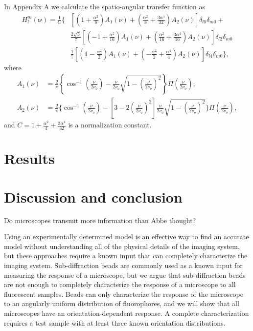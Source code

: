 \documentclass{osa-article}
\providecommand{\bs}[1]{\boldsymbol{#1}}
\begin{document}
In Appendix A we calculate the spatio-angular transfer function as
\begin{align}
  H_l^m(\bs{\nu}) = \frac{1}{C}\Bigg\{&\left[\left(1 + \frac{\alpha^2}{8}\right)A_1(\nu) + \left(\frac{\alpha^2}{8} + \frac{3\alpha^4}{32}\right)A_2(\nu)\right]\delta_{l0}\delta_{m0}+\nonumber\\&\frac{2\sqrt{5}}{7}\left[\left(-1 + \frac{\alpha^2}{16}\right)A_1(\nu) + \left(\frac{\alpha^2}{16} + \frac{3\alpha^4}{16}\right)A_2(\nu)\right]\delta_{l2}\delta_{m0}\nonumber\\&\frac{1}{7}\left[\left(1 - \frac{\alpha^2}{2}\right)A_1(\nu) + \left(-\frac{\alpha^2}{2} + \frac{\alpha^4}{4}\right)A_2(\nu)\right]\delta_{l4}\delta_{m0}\Bigg\}, 
\end{align}
where
\begin{align}
  A_1(\nu) &= \frac{2}{\pi}\left\{\cos^{-1}\left(\frac{\nu}{2\nu_o}\right) - \frac{\nu}{2\nu_o}\sqrt{1 - \left(\frac{\nu}{2\nu_o}\right)^2}\right\}\Pi\left(\frac{\nu}{2\nu_o}\right), \\
  A_2(\nu) &= \frac{2}{\pi}\Bigg\{\cos^{-1}\left(\frac{\nu}{2\nu_o}\right) - \left[3 - 2\left(\frac{\nu}{2\nu_o}\right)^2\right]\frac{\nu}{2\nu_o}\sqrt{1 - \left(\frac{\nu}{2\nu_o}\right)^2}\Bigg\}\Pi\left(\frac{\nu}{2\nu_o}\right), 
\end{align}
and $C = 1 + \frac{\alpha^2}{4} + \frac{3\alpha^4}{32}$ is a normalization
constant.

\section{Results}

\section{Discussion and conclusion}
Do microscopes transmit more information than Abbe thought?

Using an experimentally determined model is an effective way to find an accurate
model without understanding all of the physical details of the imaging system,
but these approaches require a known input that can completely characterize the
imaging system. Sub-diffraction beads are commonly used as a known input for
measuring the response of a microscope, but we argue that sub-diffraction beads
are not enough to completely characterize the response of a microscope to all
fluorescent samples. Beads can only characterize the response of the microscope
to an angularly uniform distribution of fluorophores, and we will show that all
microscopes have an orientation-dependent response. A complete characterization
requires a test sample with at least three known orientation distributions.
\end{document}
